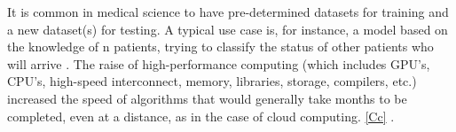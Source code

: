 It is common in medical science to have pre-determined datasets for training and a new dataset(s) for testing.		
A typical use case is, for instance, a model based on the knowledge of n patients, trying to classify the status of other patients who will arrive \citep{MULLER2019145}.		
The raise of high-performance computing (which includes GPU's, CPU's, high-speed interconnect, memory, libraries, storage, compilers, etc.) 	
increased the speed of algorithms that would generally take months to be completed, even at a distance, as in the case of cloud computing. \ref{Cc} \cite{ai}.

